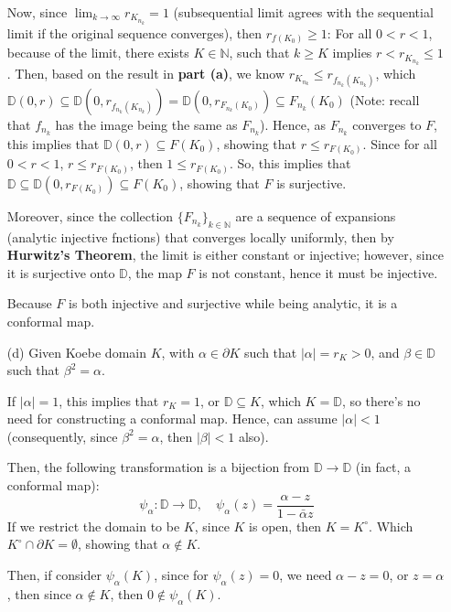 \documentclass{article}
\begin{document}
\begin{itemize}
    Now, since $\lim_{k\rightarrow\infty}r_{K_{n_k}}=1$ (subsequential limit agrees with the sequential limit if the original sequence converges), then $r_{f(K_0)}\geq 1$: For all $0<r<1$, because of the limit, there exists $K\in\mathbb{N}$, such that $k\geq K$ implies $r<r_{K_{n_k}}\leq 1$. Then, based on the result in \textbf{part (a)}, we know $r_{K_{n_k}}\leq r_{f_{n_k}(K_{n_k})}$, which $\mathbb{D}(0,r)\subseteq \mathbb{D}(0,r_{f_{n_k}(K_{n_k})})=\mathbb{D}(0,r_{F_{n_k}(K_0)})\subseteq F_{n_k}(K_0)$ (Note: recall that $f_{n_k}$ has the image being the same as $F_{n_k}$).
    Hence, as $F_{n_k}$ converges to $F$, this implies that $\mathbb{D}(0,r)\subseteq F(K_0)$, showing that $r\leq r_{F(K_0)}$.
    Since for all $0<r<1$, $r\leq r_{F(K_0)}$, then $1\leq r_{F(K_0)}$.
    So, this implies that $\mathbb{D}\subseteq \mathbb{D}(0,r_{F(K_0)})\subseteq F(K_0)$, showing that $F$ is surjective.

    Moreover, since the collection $\{F_{n_k}\}_{k\in\mathbb{N}}$ are a sequence of expansions (analytic injective fnctions) that converges locally uniformly, then by \textbf{Hurwitz's Theorem}, the limit is either constant or injective; however, since it is surjective onto $\mathbb{D}$, the map $F$ is not constant, hence it must be injective.

    Because $F$ is both injective and surjective while being analytic, it is a conformal map. 

    \hfil

    \item[(d)] Given Koebe domain $K$, with $\alpha\in \partial K$ such that $|\alpha|=r_K>0$, and $\beta\in\mathbb{D}$ such that $\beta^2=\alpha$.
    
    If $|\alpha|=1$, this implies that $r_K=1$, or $\mathbb{D}\subseteq K$, which $K=\mathbb{D}$, so there's no need for constructing a conformal map.
    Hence, can assume $|\alpha|<1$ (consequently, since $\beta^2=\alpha$, then $|\beta|<1$ also).

    Then, the following transformation is a bijection from $\mathbb{D}\rightarrow\mathbb{D}$ (in fact, a conformal map):
    $$\psi_\alpha:\mathbb{D}\rightarrow\mathbb{D},\quad \psi_\alpha(z)=\frac{\alpha-z}{1-\bar{\alpha}z}$$
    If we restrict the domain to be $K$, since $K$ is open, then $K=K^\circ$. Which $K^\circ \cap \partial K=\emptyset$, showing that $\alpha\notin K$.

    Then, if consider $\psi_\alpha(K)$, since for $\psi_\alpha(z)=0$, we need $\alpha-z=0$, or $z=\alpha$, then since $\alpha\notin K$, then $0\notin \psi_\alpha(K)$.


\end{itemize}
\end{document}
